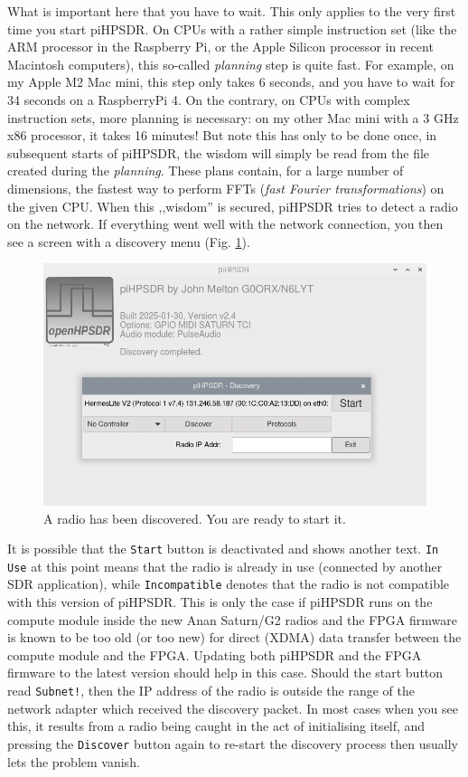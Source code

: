 \documentclass[12pt]{book}
\def\rett#1{\texttt{\color{red}#1}}
\def\pH{pi\-HPSDR\xspace}
\begin{document}
What is important here that you have to wait. This only applies to the very first time you start \pH.
On CPUs with a rather simple instruction set (like the ARM processor in the Raspberry Pi, or the Apple
Silicon processor in recent Macintosh computers), this so-called  \textit{planning} step is quite fast. For
example, on my
Apple M2 Mac mini, this step only takes 6 seconds, and you have to wait for 34 seconds on a RaspberryPi 4.
On the contrary, on CPUs with
complex instruction sets, more planning is necessary: on my other Mac mini with a 3 GHz x86 processor, it
takes 16 minutes! But note
this has only to be done once, in subsequent starts of \pH, the wisdom will simply be read from
the file created during the \textit{planning}. These plans contain, for a large number of dimensions,
the fastest way to perform FFTs (\textit{fast Fourier transformations}) on the given CPU.
When this ,,wisdom'' is secured, \pH tries to detect a radio on the network. If everything went well with
the network connection, you then see a screen with a discovery menu (Fig. \ref{fig:Start}).

\begin{figure}
\center
\includegraphics[scale=0.45]{Start.png}
\caption{A radio has been discovered. You are ready  to start it.}
\label{fig:Start}
\end{figure}

It is possible that the \rett{Start} button is deactivated and shows another text. \rett{In Use} at
this point means that the radio is already in use (connected by another SDR application), while
\rett{Incompatible} denotes that the radio is not compatible with this version of \pH. This
is only the case if \pH runs on the compute module inside the new Anan Saturn/G2
radios and the FPGA firmware is known to be too old (or too new)
for direct (XDMA) data transfer between the compute
module and the FPGA. Updating both \pH and the FPGA firmware to the latest version
should help in this case. Should the start button read \rett{Subnet!}, then the IP address of the
radio is outside the range of the network adapter which received the discovery packet.
In most cases when you see this, it results from a radio being caught in the act of initialising
itself, and pressing the \rett{Discover} button again to re-start the discovery process then
usually lets the problem vanish.
\end{document}

